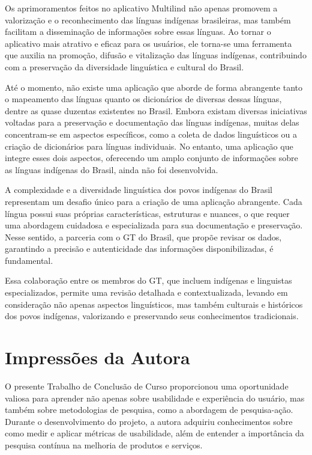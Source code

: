 Os aprimoramentos feitos no aplicativo Multilind não apenas promovem a valorização e o reconhecimento das línguas indígenas brasileiras, mas também facilitam a disseminação de informações sobre 
essas línguas. Ao tornar o aplicativo mais atrativo e eficaz para os usuários, ele torna-se uma ferramenta que auxilia na promoção, difusão e vitalização das línguas indígenas, contribuindo com 
a preservação da diversidade linguística e cultural do Brasil.

Até o momento, não existe uma aplicação que aborde de forma abrangente tanto o mapeamento das línguas quanto os dicionários de diversas dessas línguas, dentre as quase duzentas existentes no Brasil. Embora 
existam diversas iniciativas voltadas para a preservação e documentação das línguas indígenas, muitas delas concentram-se em aspectos específicos, como a coleta de dados linguísticos ou a criação de 
dicionários para línguas individuais. No entanto, uma aplicação que integre esses dois aspectos, oferecendo um amplo conjunto de informações sobre as línguas indígenas do Brasil, ainda não foi desenvolvida.

A complexidade e a diversidade linguística dos povos indígenas do Brasil representam um desafio único para a criação de uma aplicação abrangente. Cada língua possui suas próprias características, estruturas 
e nuances, o que requer uma abordagem cuidadosa e especializada para sua documentação e preservação. Nesse sentido, a parceria com o GT do Brasil, que propõe revisar os dados, garantindo a precisão e autenticidade 
das informações disponibilizadas, é fundamental. 

Essa colaboração entre os membros do GT, que incluem indígenas e linguistas especializados, permite uma revisão detalhada e contextualizada, levando em consideração não apenas aspectos linguísticos, mas também 
culturais e históricos dos povos indígenas, valorizando e preservando seus conhecimentos tradicionais.

\section{Impressões da Autora}
\label{sec:Impressões da Autora}
O presente Trabalho de Conclusão de Curso proporcionou uma oportunidade valiosa para aprender não apenas sobre usabilidade e experiência do usuário, mas também sobre metodologias de pesquisa, como a abordagem de pesquisa-ação. 
Durante o desenvolvimento do projeto, a autora adquiriu conhecimentos sobre como medir e aplicar métricas de usabilidade, além de entender a importância da pesquisa contínua na melhoria de produtos e serviços. 

